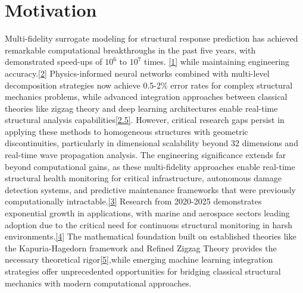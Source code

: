 \documentclass[12pt,a4paper]{report}
\begin{document}
\section{Motivation}
\label{sec:motivation}
Multi-fidelity surrogate modeling for structural response prediction has achieved remarkable computational breakthroughs in the past five years, with demonstrated speed-ups of \(10^{6}\) to \(10^{7}\) times.
\href{https://doi.org/10.1103/PhysRevAccelBeams.23.044601}{[1]} while maintaining engineering accuracy.\href{https://doi.org/10.48550/arXiv.2105.00856}{[2]} 
 Physics-informed neural networks combined with multi-level decomposition strategies now achieve 0.5-2\% error rates for complex structural mechanics problems, while advanced integration approaches between classical theories like zigzag theory and deep learning architectures enable real-time structural analysis capabilities\href{https://www.researchgate.net/publication/358749953_Extended_Physics-Informed_Neural_Networks_for_Solving_Fluid_Flow_Problems_in_Highly_Heterogeneous_Media}{[2.5]}. However, critical research gaps persist in applying these methods to homogeneous structures with geometric discontinuities, particularly in dimensional scalability beyond 32 dimensions and real-time wave propagation analysis. The engineering significance extends far beyond computational gains, as these multi-fidelity approaches enable real-time structural health monitoring for critical infrastructure, autonomous damage detection systems, and predictive maintenance frameworks that were previously computationally intractable.\href{https://doi.org/10.3390/s23063293}{[3]}
 Research from 2020-2025 demonstrates exponential growth in applications, with marine and aerospace sectors leading adoption due to the critical need for continuous structural monitoring in harsh environments.\href{https://doi.org/10.3390/s20102778}{[4]}
 The mathematical foundation built on established theories like the Kapuria-Hagedorn framework and Refined Zigzag Theory provides the necessary theoretical rigor\href{http://dx.doi.org/10.2140/jomms.2007.2.1267}{[5]},while emerging machine learning integration strategies offer unprecedented opportunities for bridging classical structural mechanics with modern computational approaches.
\end{document}

